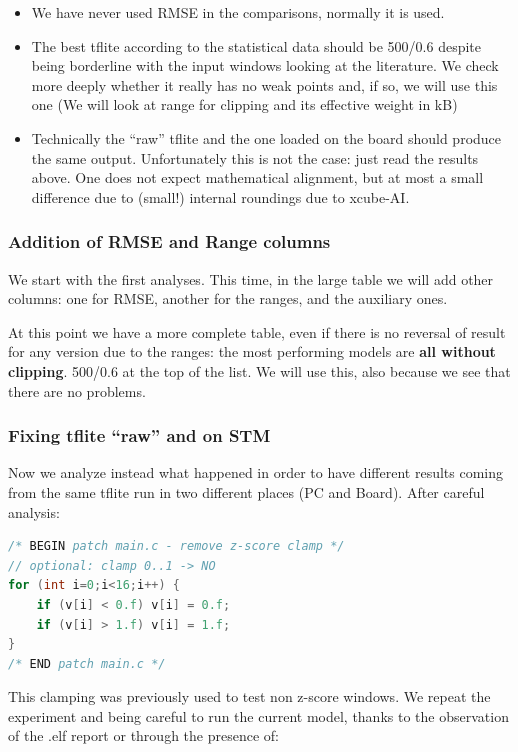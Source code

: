\begin{itemize}
    \item We have never used RMSE in the comparisons, normally it is used.
    \item The best tflite according to the statistical data should be 500/0.6 despite being borderline with the input windows looking at the literature. We check more deeply whether it really has no weak points and, if so, we will use this one (We will look at range for clipping and its effective weight in kB)
    \item Technically the ``raw'' tflite and the one loaded on the board should produce the same output. Unfortunately this is not the case: just read the results above. One does not expect mathematical alignment, but at most a small difference due to (small!) internal roundings due to xcube-AI.
\end{itemize}

\subsubsection{Addition of RMSE and Range columns}
We start with the first analyses. This time, in the large table we will add other columns: one for RMSE, another for the ranges, and the auxiliary ones.

At this point we have a more complete table, even if there is no reversal of result for any version due to the ranges: the most performing models are \textbf{all without clipping}. 500/0.6 at the top of the list. We will use this, also because we see that there are no problems.

\subsubsection{Fixing tflite ``raw'' and on STM}
Now we analyze instead what happened in order to have different results coming from the same tflite run in two different places (PC and Board). After careful analysis:

\begin{lstlisting}[language=C]
/* BEGIN patch main.c - remove z-score clamp */
// optional: clamp 0..1 -> NO
for (int i=0;i<16;i++) {
    if (v[i] < 0.f) v[i] = 0.f;
    if (v[i] > 1.f) v[i] = 1.f;
}
/* END patch main.c */
\end{lstlisting}

This clamping was previously used to test non z-score windows. We repeat the experiment and being careful to run the current model, thanks to the observation of the .elf report or through the presence of:

